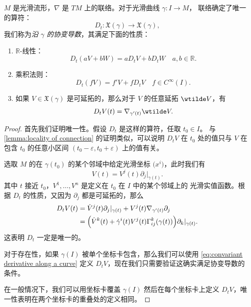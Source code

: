 \begin{theorem}[沿曲线的协变导数]\label{thm:convariant derivative along a curve}
  $M$ 是光滑流形，$\nabla$ 是 $TM$ 上的联络。对于光滑曲线 $\gamma:I\to M$，
  联络确定了唯一的算符：
  \[
    D_t:\mathfrak{X}(\gamma)\to \mathfrak{X}(\gamma),  
  \]
  我们称为\emph{沿 $\gamma$ 的协变导数}，其满足下面的性质：
  \begin{enumerate}
    \item $\mathbb{R}$-线性：
    \[
      D_t(aV+bW)=aD_tV+bD_tW\quad a,b\in \mathbb{R}.  
    \]
    \item 乘积法则：
    \[
      D_t(fV)=f'V+fD_tV\quad f\in C^\infty(I).  
    \]
    \item 如果 $V\in \mathfrak{X}(\gamma)$ 是可延拓的，那么对于 $V$ 的任意延拓 $\wtilde V$，有
    \[
      D_tV(t)=\nabla_{\gamma'(t)}\wtilde V.  
    \]
  \end{enumerate}
\end{theorem}
\begin{proof}
  首先我们证明唯一性。假设 $D_t$ 是这样的算符，任取 $t_0\in I$。
  与 \autoref{lemma:locality of connection} 的证明类似，可以说明 $D_tV$
  在 $t_0$ 处的值只与 $V$ 在包含 $t_0$ 的任意小区间 $(t_0-\varepsilon,t_0+\varepsilon)$
  上的值有关。

  选取 $M$ 的在 $\gamma(t_0)$ 的某个邻域中给定光滑坐标 $\bigl(x^i\bigr)$，此时我们有
  \[
    V(t)=V^j(t)\partial_j|_{\gamma(t)}.  
  \]
  其中 $t$ 接近 $t_0$，$V^1,\dots,V^n$ 是定义在 $t_0$ 在 $I$ 中的某个邻域上的 
  光滑实值函数。根据 $D_t$ 的性质，又因为 $\partial_j$ 都是可延拓的，那么
  \begin{equation}\label{eq:convariant derivative along a curve}
    \begin{aligned}
      D_tV(t)&=\dot V^j(t)\partial_j|_{\gamma(t)}+V^j(t)\nabla_{\gamma'(t)}\partial_j\\
      &=\Bigl(\dot V^k(t)+\dot\gamma^i(t)V^j(t)\Gamma_{ij}^k(\gamma(t))\Bigr)
      \partial_k|_{\gamma(t)}.
    \end{aligned}
  \end{equation}
  这表明 $D_t$ 一定是唯一的。

  对于存在性，如果 $\gamma(I)$ 被单个坐标卡包含，那么我们可以使用 \eqref{eq:convariant derivative along a curve} 
  定义 $D_tV$，现在我们只需要验证这确实满足协变导数的条件。
  
  在一般情况下，我们可以用坐标卡覆盖 $\gamma(I)$
  然后在每个坐标卡上定义 $D_tV$，唯一性表明在两个坐标卡的重叠处的定义相同。
\end{proof}

